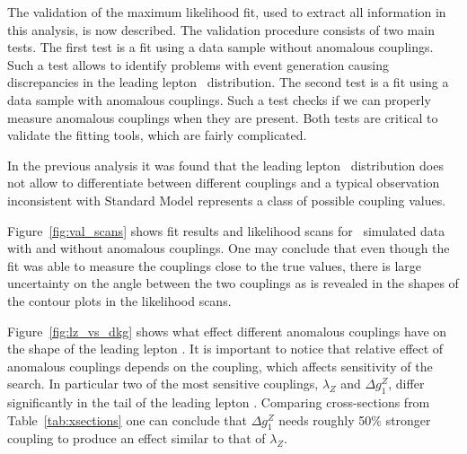 The validation of the maximum likelihood fit, used to extract all information in this
analysis, is now described. The validation procedure consists of
two main tests. The first test is a fit using a data sample without
anomalous couplings. Such a test allows to identify problems with
event generation causing discrepancies in the leading lepton
\pt\ distribution. The second test is a fit using a data sample with
anomalous couplings. Such a test checks if we can properly measure
anomalous couplings when they are present. Both tests are critical to
validate the fitting tools, which are fairly complicated.

In the previous analysis it was found that the leading lepton
\pt\ distribution does not allow to differentiate between different
couplings and a typical observation inconsistent with Standard Model
represents a class of possible coupling values.

Figure~\ref{fig:val_scans} shows fit results and likelihood scans for
\ww\ simulated data with and without anomalous couplings. One may
conclude that even though the fit was able to measure the couplings
close to the true values, there is large uncertainty on the angle
between the two couplings as is revealed in the shapes of the contour
plots in the likelihood scans.

Figure~\ref{fig:lz_vs_dkg} shows what effect different anomalous
couplings have on the shape of the leading lepton \pt{}. It is
important to notice that relative effect of anomalous couplings
depends on the coupling, which affects sensitivity of the search. In
particular two of the most sensitive couplings, $\lambda_{Z}$ and
$\Delta g^Z_1$, differ significantly in the tail of the leading
lepton \pt{}. Comparing cross-sections from Table~\ref{tab:xsections}
one can conclude that $\Delta g^Z_1$ needs roughly 50\% stronger
coupling to produce an effect similar to that of $\lambda_{Z}$.

